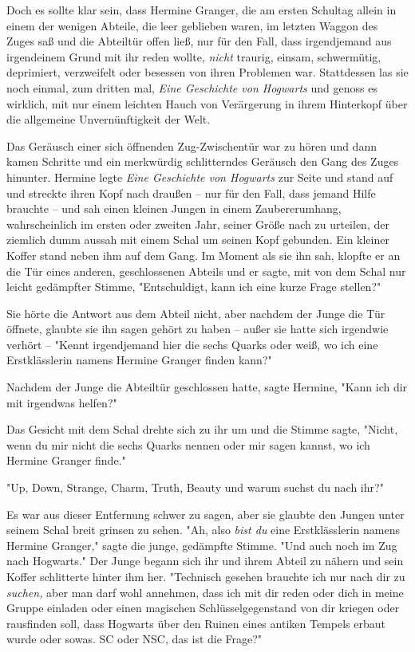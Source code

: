 {Doch es sollte klar sein, dass Hermine Granger, die am ersten Schultag allein in einem der wenigen Abteile, die leer geblieben waren, im letzten Waggon des Zuges saß und die Abteiltür offen ließ, nur für den Fall, dass irgendjemand aus irgendeinem Grund mit ihr reden wollte, \emph{nicht} traurig, einsam, schwermütig, deprimiert, verzweifelt oder besessen von ihren Problemen war. Stattdessen las sie noch einmal, zum dritten mal, \emph{Eine Geschichte von Hogwarts} und genoss es wirklich, mit nur einem leichten Hauch von Verärgerung in ihrem Hinterkopf über die allgemeine Unvernünftigkeit der Welt.

Das Geräusch einer sich öffnenden Zug-Zwischentür war zu hören und dann kamen Schritte und ein merkwürdig schlitterndes Geräusch den Gang des Zuges hinunter. Hermine legte \emph{Eine Geschichte von Hogwarts} zur Seite und stand auf und streckte ihren Kopf nach draußen -- nur für den Fall, dass jemand Hilfe brauchte -- und sah einen kleinen Jungen in einem Zaubererumhang, wahrscheinlich im ersten oder zweiten Jahr, seiner Größe nach zu urteilen, der ziemlich dumm aussah mit einem Schal um seinen Kopf gebunden. Ein kleiner Koffer stand neben ihm auf dem Gang. Im Moment als sie ihn sah, klopfte er an die Tür eines anderen, geschlossenen Abteils und er sagte, mit von dem Schal nur leicht gedämpfter Stimme, "Entschuldigt, kann ich eine kurze Frage stellen?"

Sie hörte die Antwort aus dem Abteil nicht, aber nachdem der Junge die Tür öffnete, glaubte sie ihn sagen gehört zu haben -- außer sie hatte sich irgendwie verhört -- "Kennt irgendjemand hier die sechs Quarks oder weiß, wo ich eine Erstklässlerin namens Hermine Granger finden kann?"

Nachdem der Junge die Abteiltür geschlossen hatte, sagte Hermine, "Kann ich dir mit irgendwas helfen?"

Das Gesicht mit dem Schal drehte sich zu ihr um und die Stimme sagte, "Nicht, wenn du mir nicht die sechs Quarks nennen oder mir sagen kannst, wo ich Hermine Granger finde."

"Up, Down, Strange, Charm, Truth, Beauty und warum suchst du nach ihr?"

Es war aus dieser Entfernung schwer zu sagen, aber sie glaubte den Jungen unter seinem Schal breit grinsen zu sehen. "Ah, also \emph{bist du} eine Erstklässlerin namens Hermine Granger," sagte die junge, gedämpfte Stimme. "Und auch noch im Zug nach Hogwarts." Der Junge begann sich ihr und ihrem Abteil zu nähern und sein Koffer schlitterte hinter ihm her. "Technisch gesehen brauchte ich nur nach dir zu \emph{suchen,} aber man darf wohl annehmen, dass ich mit dir reden oder dich in meine Gruppe einladen oder einen magischen Schlüsselgegenstand von dir kriegen oder rausfinden soll, dass Hogwarts über den Ruinen eines antiken Tempels erbaut wurde oder sowas. SC oder NSC, das ist die Frage?"

}
